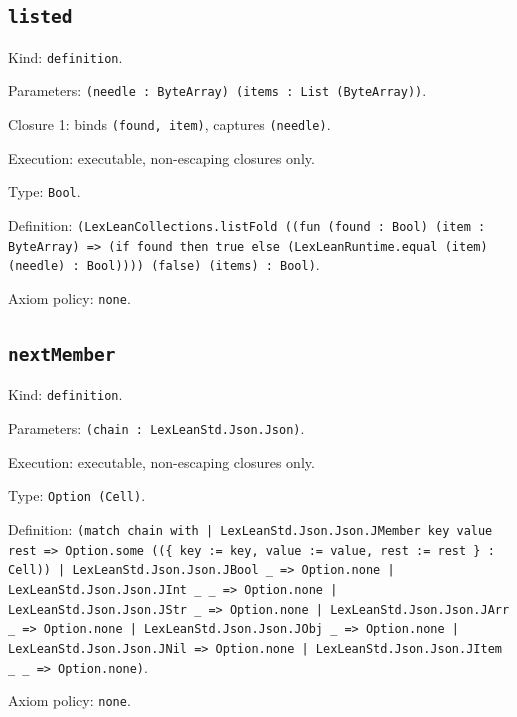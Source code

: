 \documentclass[11pt]{article}
\begin{document}
\subsection*{\texttt{listed}}
\noindent Kind: \texttt{definition}.\par
\noindent Parameters: \texttt{(needle : ByteArray) (items : List (ByteArray))}.\par
\noindent Closure 1: binds \texttt{(found, item)}, captures \texttt{(needle)}.\par
\noindent Execution: executable, non-escaping closures only.\par
\noindent Type: \texttt{Bool}.\par
\noindent Definition: \texttt{(LexLeanCollections.listFold ((fun (found : Bool) (item : ByteArray) => (if found then true else (LexLeanRuntime.equal (item) (needle) : Bool)))) (false) (items) : Bool)}.\par
\noindent Axiom policy: \texttt{none}.\par
\subsection*{\texttt{nextMember}}
\noindent Kind: \texttt{definition}.\par
\noindent Parameters: \texttt{(chain : LexLeanStd.Json.Json)}.\par
\noindent Execution: executable, non-escaping closures only.\par
\noindent Type: \texttt{Option (Cell)}.\par
\noindent Definition: \texttt{(match chain with | LexLeanStd.Json.Json.JMember key value rest => Option.some ((\{ key := key, value := value, rest := rest \} : Cell)) | LexLeanStd.Json.Json.JBool \_ => Option.none | LexLeanStd.Json.Json.JInt \_ \_ => Option.none | LexLeanStd.Json.Json.JStr \_ => Option.none | LexLeanStd.Json.Json.JArr \_ => Option.none | LexLeanStd.Json.Json.JObj \_ => Option.none | LexLeanStd.Json.Json.JNil => Option.none | LexLeanStd.Json.Json.JItem \_ \_ => Option.none)}.\par
\noindent Axiom policy: \texttt{none}.\par
\end{document}
